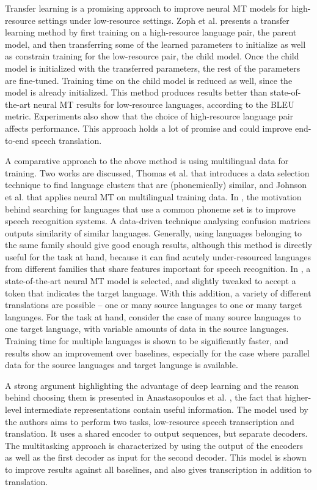 \documentclass{article}
\begin{document}
Transfer learning is a promising approach to improve neural MT models for high-resource settings under low-resource settings. Zoph et al. \cite{Zoph:16} presents a transfer learning method by first training on a high-resource language pair, the parent model, and then transferring some of the learned parameters to initialize as well as constrain training for the low-resource pair, the child model. Once the child model is initialized with the transferred parameters, the rest of the parameters are fine-tuned. Training time on the child model is reduced as well, since the model is already initialized. This method produces results better than state-of-the-art neural MT results for low-resource languages, according to the BLEU metric. Experiments also show that the choice of high-resource language pair affects performance. This approach holds a lot of promise and could improve end-to-end speech translation. \medskip

A comparative approach to the above method is using multilingual data for training. Two works are discussed, Thomas et al. \cite{Thomas:16} that introduces a data selection technique to find language clusters that are (phonemically) similar, and Johnson et al. \cite{Johnson:17} that applies neural MT on multilingual training data. In \cite{Thomas:16}, the motivation behind searching for languages that use a common phoneme set is to improve speech recognition systems. A data-driven technique analysing confusion matrices outputs similarity of similar languages. Generally, using languages belonging to the same family should give good enough results, although this method is directly useful for the task at hand, because it can find acutely under-resourced languages from different families that share features important for speech recognition. In \cite{Johnson:17}, a state-of-the-art neural MT model is selected, and slightly tweaked to accept a token that indicates the target language. With this addition, a variety of different translations are possible – one or many source languages to one or many target languages. For the task at hand, consider the case of many source languages to one target language, with variable amounts of data in the source languages. Training time for multiple languages is shown to be significantly faster, and results show an improvement over baselines, especially for the case where parallel data for the source languages and target language is available. \medskip

A strong argument highlighting the advantage of deep learning and the reason behind choosing them is presented in Anastasopoulos et al. \cite{Anastasopoulos:18}, the fact that higher-level intermediate representations contain useful information. The model used by the authors aims to perform two tasks, low-resource speech transcription and translation. It uses a shared encoder to output sequences, but separate decoders. The multitasking approach is characterized by using the output of the encoders as well as the first decoder as input for the second decoder. This model is shown to improve results against all baselines, and also gives transcription in addition to translation. \medskip
\end{document}
